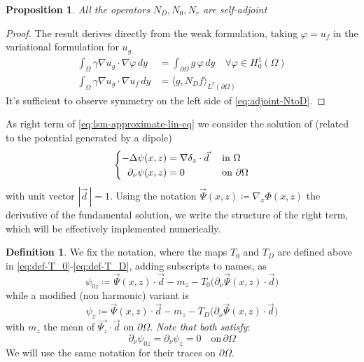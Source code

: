 \documentclass[10pt, a4paper, twoside, openright]{book}
\theoremstyle{definition}
\newtheorem{definition}[subsection]{Definition}
\theoremstyle{plain}
\theoremstyle{plain}
\theoremstyle{plain}
\newtheorem{proposition}[subsection]{Proposition}
\theoremstyle{plain}
\theoremstyle{plain}
\theoremstyle{plain}
\theoremstyle{plain}
\theoremstyle{plain}
\let\phi\varphi
\begin{document}
 \begin{proposition}
  All the operators ${N_D}, {N_0}, {N_r}$ are self-adjoint
 \end{proposition}
 \begin{proof}
 The result derives directly from the weak formulation, taking $\phi=u_f$ in the variational formulation for $u_g$
 \begin{align}
  \int_{\Omega}\gamma\nabla u_g \cdot \nabla \phi\,dy &= \int_{\partial\Omega}g\,\phi\,dy \quad \forall \phi\in H^1_0(\Omega) \\
  \int_{\Omega}\gamma\nabla u_g \cdot \nabla u_f\,dy &= \langle g, {N_D} f\rangle_{L^2(\partial \Omega)} \label{eq:adjoint-NtoD}
 \end{align}
 It's sufficient to observe symmetry on the left side of \eqref{eq:adjoint-NtoD}.
 \end{proof}
 As right term of \eqref{eq:lsm-approximate-lin-eq} we consider the solution of (related to the potential generated by a dipole)
 \begin{equation}
 \left\{
 \begin{aligned}
   -\Delta \psi(x,z) &= \nabla\delta_{z} \cdot \vec{d} && \textup{ in }\Omega \\
   \partial_\nu\psi(x,z) &= 0 &&\textup{ on }\partial \Omega
 \end{aligned}
 \right.
 \end{equation}
 with unit vector $|\vec{d}\,|=1$. Using the notation $\vec{\Psi}(x,z)\coloneqq\nabla_x\Phi(x,z)$ the derivative of the fundamental solution, we write the structure of the right term, which will be effectively implemented numerically.
 \begin{definition}
 \label{def:lsm-psi}
  We fix the notation, where the maps $T_0$ and $T_D$ are defined above in \eqref{eq:def-T_0}-\eqref{eq:def-T_D}, adding subscripts to names, as
 \begin{equation}
 \psi_{0z} \coloneqq \vec{\Psi}(x,z)\cdot\vec{d} - m_z - T_0\bigl(\partial_\nu \vec{\Psi}(x,z) \cdot \vec{d}\bigr)
  \end{equation}
  while a modified (non harmonic) variant is
  \begin{equation}
  \psi_{z} \coloneqq \vec{\Psi}(x,z)\cdot\vec{d} - m_z - T_D\bigl(\partial_\nu \vec{\Psi}(x,z) \cdot \vec{d}\bigr)
  \end{equation}
  with $m_z$ the mean of $\vec{\Psi_z}\cdot\vec{d}$ on $\partial \Omega$. \emph{Note that both satisfy}:
  \begin{equation*}
  \partial_\nu \psi_{0z} = \partial_\nu \psi_z = 0\quad\text{on}\,\partial \Omega
  \end{equation*}
  We will use the same notation for their traces on $\partial \Omega$.
 \end{definition}
\end{document}
